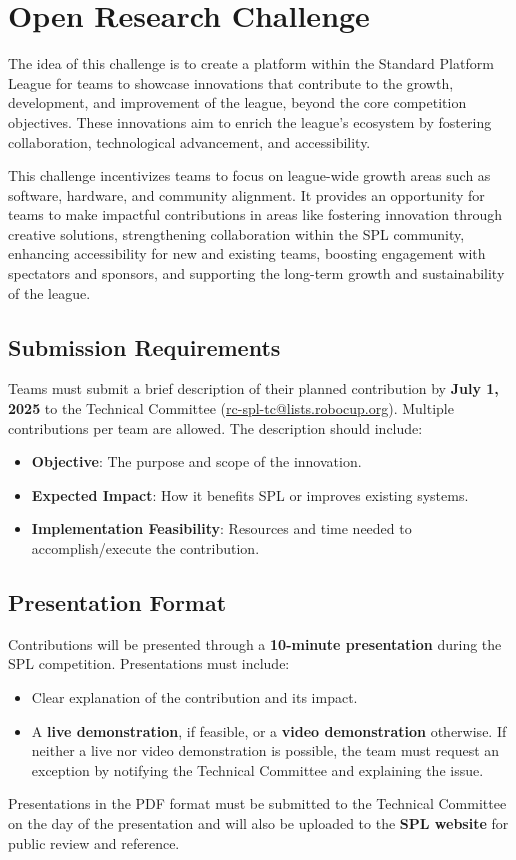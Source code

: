 \section{Open Research Challenge}
The idea of this challenge is to create a platform within the Standard Platform League for teams to showcase innovations that contribute to the growth, development, and improvement of the league, beyond the core competition objectives. These innovations aim to enrich the league's ecosystem by fostering collaboration, technological advancement, and accessibility.

This challenge incentivizes teams to focus on league-wide growth areas such as software, hardware, and community alignment. It provides an opportunity for teams to make impactful contributions in areas like fostering innovation through creative solutions, strengthening collaboration within the SPL community, enhancing accessibility for new and existing teams, boosting engagement with spectators and sponsors, and supporting the long-term growth and sustainability of the league.

\subsection{Submission Requirements}
Teams must submit a brief description of their planned contribution by \textbf{July 1, 2025} to the Technical Committee (\url{rc-spl-tc@lists.robocup.org}).
Multiple contributions per team are allowed.
The description should include:
    \begin{itemize}
        \item \textbf{Objective}: The purpose and scope of the innovation.
        \item \textbf{Expected Impact}: How it benefits SPL or improves existing systems.
        \item \textbf{Implementation Feasibility}: Resources and time needed to accomplish/execute the contribution.
    \end{itemize}

\subsection{Presentation Format}
Contributions will be presented through a \textbf{10-minute presentation} during the SPL competition.
Presentations must include:
\begin{itemize}
    \item Clear explanation of the contribution and its impact.
    \item A \textbf{live demonstration}, if feasible, or a \textbf{video demonstration} otherwise. If neither a live nor video demonstration is possible, the team must request an exception by notifying the Technical Committee and explaining the issue.
\end{itemize}
Presentations in the PDF format must be submitted to the Technical Committee on the day of the presentation and will also be uploaded to the \textbf{SPL website} for public review and reference.

